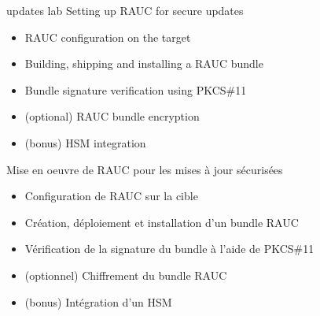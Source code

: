 {updates}
{lab}
{Setting up RAUC for secure updates}
{
  \begin{itemize}
  \item RAUC configuration on the target
  \item Building, shipping and installing a RAUC bundle 
  \item Bundle signature verification using PKCS\#11
  \item (optional) RAUC bundle encryption
  \item (bonus) HSM integration
  \end{itemize}
}
{Mise en oeuvre de RAUC pour les mises à jour sécurisées}
{
  \begin{itemize}
  \item Configuration de RAUC sur la cible
  \item Création, déploiement et installation d’un bundle RAUC
  \item Vérification de la signature du bundle à l’aide de PKCS\#11
  \item (optionnel) Chiffrement du bundle RAUC
  \item (bonus) Intégration d’un HSM
  \end{itemize}
}

\def \agendaboards{imx93-frdm}

\def \onsiteagenda {
  \ifthenelse{\equal{\agendalanguage}{french}}{
    \section{Programme de la formation}
  }{
    \section{Training Schedule}
  }
  \begin{tabularx}{\textwidth}{p{2cm}p{5cm}p{11cm}}
  \showagendaday{1}
  \showagendaitem{overview}{lecture}
  \showagendaitem{pki}{lab}
  \showagendaday{2}
  \showagendaitem{hwsec}{lecture}
  \showagendaitem{hwsec}{lab}
  \showagendaday{3}
  \showagendaitem{secureboot}{lecture}
  \showagendaitem{secureboot}{lab}
  \showagendaday{4}
  \showagendaitem{secureuboot}{lecture}
  \showagendaitem{secureuboot}{lab}
  \showagendaday{5}
  \showagendaitem{filesystem}{lecture}
  \showagendaitem{keymanagement}{lab}
  \showagendaday{6}
  \showagendaitem{userland}{lecture}
  \showagendaitem{userland}{lab}
  \showagendaday{7}
  \showagendaitem{measuredboot}{lecture}
  \showagendaitem{compliance}{lecture}
  \showagendaitem{compliance}{lab}
  \showagendaday{8}
  \showagendaitem{updates}{lecture}
  \showagendaitem{updates}{lab}
  \end{tabularx}
}

